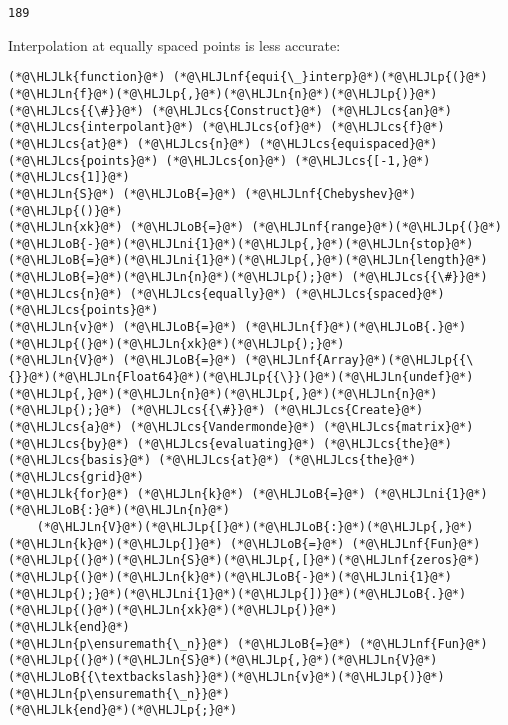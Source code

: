 \documentclass[12pt,a4paper]{article}
\newcommand{\HLJLk}[1]{\textcolor[RGB]{148,91,176}{\textbf{#1}}}
\newcommand{\HLJLn}[1]{#1}
\newcommand{\HLJLnf}[1]{\textcolor[RGB]{66,102,213}{#1}}
\newcommand{\HLJLni}[1]{\textcolor[RGB]{59,151,46}{#1}}
\newcommand{\HLJLoB}[1]{\textcolor[RGB]{102,102,102}{\textbf{#1}}}
\newcommand{\HLJLp}[1]{#1}
\newcommand{\HLJLcs}[1]{\textcolor[RGB]{153,153,119}{\textit{#1}}}
\begin{document}
\begin{lstlisting}
189
\end{lstlisting}


Interpolation at equally spaced points is less accurate:


\begin{lstlisting}
(*@\HLJLk{function}@*) (*@\HLJLnf{equi{\_}interp}@*)(*@\HLJLp{(}@*)(*@\HLJLn{f}@*)(*@\HLJLp{,}@*)(*@\HLJLn{n}@*)(*@\HLJLp{)}@*)
(*@\HLJLcs{{\#}}@*) (*@\HLJLcs{Construct}@*) (*@\HLJLcs{an}@*) (*@\HLJLcs{interpolant}@*) (*@\HLJLcs{of}@*) (*@\HLJLcs{f}@*) (*@\HLJLcs{at}@*) (*@\HLJLcs{n}@*) (*@\HLJLcs{equispaced}@*) (*@\HLJLcs{points}@*) (*@\HLJLcs{on}@*) (*@\HLJLcs{[-1,}@*) (*@\HLJLcs{1]}@*)
(*@\HLJLn{S}@*) (*@\HLJLoB{=}@*) (*@\HLJLnf{Chebyshev}@*)(*@\HLJLp{()}@*)
(*@\HLJLn{xk}@*) (*@\HLJLoB{=}@*) (*@\HLJLnf{range}@*)(*@\HLJLp{(}@*)(*@\HLJLoB{-}@*)(*@\HLJLni{1}@*)(*@\HLJLp{,}@*)(*@\HLJLn{stop}@*)(*@\HLJLoB{=}@*)(*@\HLJLni{1}@*)(*@\HLJLp{,}@*)(*@\HLJLn{length}@*)(*@\HLJLoB{=}@*)(*@\HLJLn{n}@*)(*@\HLJLp{);}@*) (*@\HLJLcs{{\#}}@*) (*@\HLJLcs{n}@*) (*@\HLJLcs{equally}@*) (*@\HLJLcs{spaced}@*) (*@\HLJLcs{points}@*)
(*@\HLJLn{v}@*) (*@\HLJLoB{=}@*) (*@\HLJLn{f}@*)(*@\HLJLoB{.}@*)(*@\HLJLp{(}@*)(*@\HLJLn{xk}@*)(*@\HLJLp{);}@*)
(*@\HLJLn{V}@*) (*@\HLJLoB{=}@*) (*@\HLJLnf{Array}@*)(*@\HLJLp{{\{}}@*)(*@\HLJLn{Float64}@*)(*@\HLJLp{{\}}(}@*)(*@\HLJLn{undef}@*)(*@\HLJLp{,}@*)(*@\HLJLn{n}@*)(*@\HLJLp{,}@*)(*@\HLJLn{n}@*)(*@\HLJLp{);}@*) (*@\HLJLcs{{\#}}@*) (*@\HLJLcs{Create}@*) (*@\HLJLcs{a}@*) (*@\HLJLcs{Vandermonde}@*) (*@\HLJLcs{matrix}@*) (*@\HLJLcs{by}@*) (*@\HLJLcs{evaluating}@*) (*@\HLJLcs{the}@*) (*@\HLJLcs{basis}@*) (*@\HLJLcs{at}@*) (*@\HLJLcs{the}@*) (*@\HLJLcs{grid}@*)
(*@\HLJLk{for}@*) (*@\HLJLn{k}@*) (*@\HLJLoB{=}@*) (*@\HLJLni{1}@*)(*@\HLJLoB{:}@*)(*@\HLJLn{n}@*)
    (*@\HLJLn{V}@*)(*@\HLJLp{[}@*)(*@\HLJLoB{:}@*)(*@\HLJLp{,}@*)(*@\HLJLn{k}@*)(*@\HLJLp{]}@*) (*@\HLJLoB{=}@*) (*@\HLJLnf{Fun}@*)(*@\HLJLp{(}@*)(*@\HLJLn{S}@*)(*@\HLJLp{,[}@*)(*@\HLJLnf{zeros}@*)(*@\HLJLp{(}@*)(*@\HLJLn{k}@*)(*@\HLJLoB{-}@*)(*@\HLJLni{1}@*)(*@\HLJLp{);}@*)(*@\HLJLni{1}@*)(*@\HLJLp{])}@*)(*@\HLJLoB{.}@*)(*@\HLJLp{(}@*)(*@\HLJLn{xk}@*)(*@\HLJLp{)}@*)
(*@\HLJLk{end}@*)
(*@\HLJLn{p\ensuremath{\_n}}@*) (*@\HLJLoB{=}@*) (*@\HLJLnf{Fun}@*)(*@\HLJLp{(}@*)(*@\HLJLn{S}@*)(*@\HLJLp{,}@*)(*@\HLJLn{V}@*)(*@\HLJLoB{{\textbackslash}}@*)(*@\HLJLn{v}@*)(*@\HLJLp{)}@*)
(*@\HLJLn{p\ensuremath{\_n}}@*)
(*@\HLJLk{end}@*)(*@\HLJLp{;}@*)
\end{lstlisting}
\end{document}
